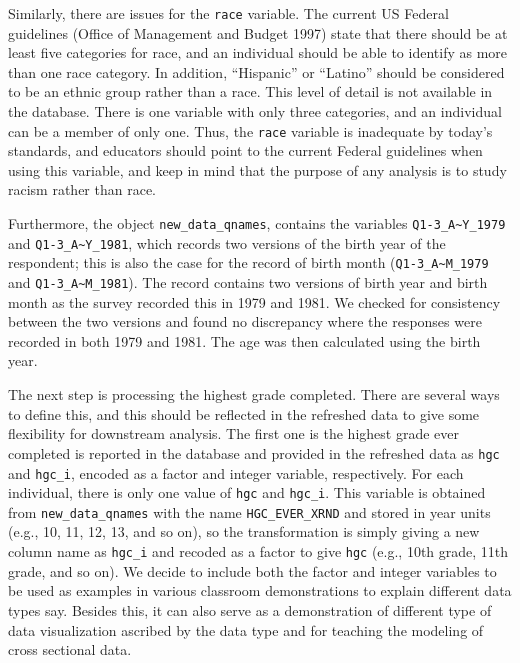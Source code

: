 \documentclass{article}
\begin{document}
Similarly, there are issues for the \texttt{race} variable. The current US Federal guidelines (Office of Management and Budget 1997) state that there should be at least five categories for race, and an individual should be able to identify as more than one race category. In addition, ``Hispanic'' or ``Latino'' should be considered to be an ethnic group rather than a race. This level of detail is not available in the database. There is one variable with only three categories, and an individual can be a member of only one. Thus, the \texttt{race} variable is inadequate by today's standards, and educators should point to the current Federal guidelines when using this variable, and keep in mind that the purpose of any analysis is to study racism rather than race.

Furthermore, the object \texttt{new\_data\_qnames}, contains the variables \texttt{Q1-3\_A\textasciitilde{}Y\_1979} and \texttt{Q1-3\_A\textasciitilde{}Y\_1981}, which records two versions of the birth year of the respondent; this is also the case for the record of birth month (\texttt{Q1-3\_A\textasciitilde{}M\_1979} and \texttt{Q1-3\_A\textasciitilde{}M\_1981}). The record contains two versions of birth year and birth month as the survey recorded this in 1979 and 1981. We checked for consistency between the two versions and found no discrepancy where the responses were recorded in both 1979 and 1981. The age was then calculated using the birth year.

The next step is processing the highest grade completed. There are several ways to define this, and this should be reflected in the refreshed data to give some flexibility for downstream analysis. The first one is the highest grade ever completed is reported in the database and provided in the refreshed data as \texttt{hgc} and \texttt{hgc\_i}, encoded as a factor and integer variable, respectively. For each individual, there is only one value of \texttt{hgc} and \texttt{hgc\_i}. This variable is obtained from \texttt{new\_data\_qnames} with the name \texttt{HGC\_EVER\_XRND} and stored in year units (e.g., 10, 11, 12, 13, and so on), so the transformation is simply giving a new column name as \texttt{hgc\_i} and recoded as a factor to give \texttt{hgc} (e.g., 10th grade, 11th grade, and so on). We decide to include both the factor and integer variables to be used as examples in various classroom demonstrations to explain different data types say. Besides this, it can also serve as a demonstration of different type of data visualization ascribed by the data type and for teaching the modeling of cross sectional data.
\end{document}
